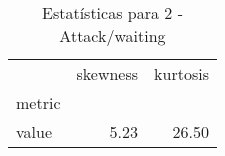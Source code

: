 \begin{table}[htbp]
\caption{Estatísticas para 2 - Attack/waiting}
\label{tab:2_-_attack_waiting_skewkurt}
\begin{tabular}{lrr}
\toprule
 & skewness & kurtosis \\
metric &  &  \\
\midrule
value & 5.23 & 26.50 \\
\bottomrule
\end{tabular}
\end{table}
